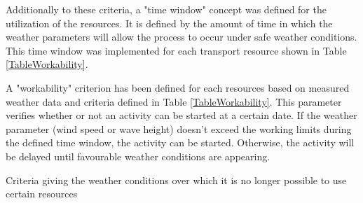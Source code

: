 Additionally to these criteria, a "time window" concept was defined for the utilization of the resources. It is defined by the amount of time in which the weather parameters will allow the process to occur under safe weather conditions. This time window was implemented for each transport resource shown in Table \ref{TableWorkability}.

A "workability" criterion has been defined for each resources based on measured weather data and criteria defined in Table \ref{TableWorkability}. This parameter verifies whether or not an activity can be started at a certain date. If the weather parameter (wind speed or wave height) doesn't exceed the working limits during the defined time window, the activity can be started. Otherwise, the activity will be delayed until favourable weather conditions are appearing.

\begin{table}[!hbp]
\caption{Criteria giving the weather conditions over which it is no longer possible to use certain resources}
\begin{center}

\end{center}
\label{TableWorkability}
\end{table}

